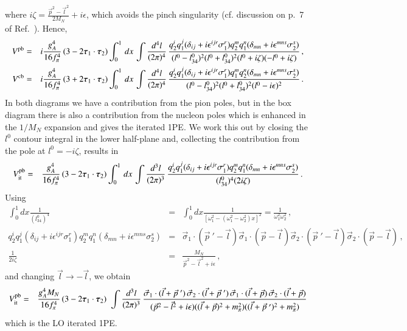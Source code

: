 \documentclass[sort&compress,preprint,3p]{elsarticle}
\begin{document}
where 
$i\zeta=\frac{\vec p^2-\vec l^2}{2M_N}+i\epsilon$, 
which avoids the pinch singularity (cf. discussion on p.~7 of Ref.~\cite{Wei91}). 
Hence,
%
\begin{eqnarray}
V^{\rm pb} &=& i \frac{g_A^4}{16 f_\pi^4} \,
(3-2 \mbox{\boldmath $\tau$}_1 \cdot \mbox{\boldmath $\tau$}_2)
\int_0^1\, dx\,\int \frac{d^4 l}{(2\pi)^4} \,
\frac{q^i_2 q^j_1 (\delta_{ij} + i \epsilon^{ijr} \sigma_1^r)
q_2^m q_1^n (\delta_{mn} + i \epsilon^{mns} \sigma_2^s)}
{(l^0-l^0_{34})^2(l^0+l^0_{34})^2(l^0+i\zeta)(-l^0+i\zeta)}
\,,
\\
V^{\rm cb} &=& i \frac{g_A^4}{16 f_\pi^4} \,
(3+2 \mbox{\boldmath $\tau$}_1 \cdot \mbox{\boldmath $\tau$}_2)
\int_0^1\, dx\,\int \frac{d^4 l}{(2\pi)^4} \,
\frac{q^i_2 q^j_1 (\delta_{ij} + i \epsilon^{ijr} \sigma_1^r)
q_1^m q_2^n (\delta_{mn} + i \epsilon^{mns} \sigma_2^s)}
{(l^0-l^0_{34})^2(l^0+l^0_{34})^2(l^0-i\epsilon)^2}
\,.
\end{eqnarray}
%
In both diagrams we have a contribution from the pion poles, but in the box
diagram there is also a contribution from the nucleon poles which is enhanced
in the $1/M_N$ expansion and gives the iterated 1PE. We work this out by
closing the $l^0$ contour integral in the lower half-plane and, collecting the
contribution from the pole at $l^0=-i\zeta$, results in
%
\begin{eqnarray}
V^{\rm pb}_{\rm it} &=& \frac{g_A^4}{16 f_\pi^4} \,
(3-2 \mbox{\boldmath $\tau$}_1 \cdot \mbox{\boldmath $\tau$}_2)
\int_0^1\, dx\,\int \frac{d^3 l}{(2\pi)^3} \,
\frac{q^i_2 q^j_1 (\delta_{ij} + i \epsilon^{ijr} \sigma_1^r)
q_2^m q_1^n (\delta_{mn} + i \epsilon^{mns} \sigma_2^s)}
{(l^0_{34})^4(2i\zeta)}
\,.
\end{eqnarray}
%
Using
\begin{eqnarray} 
\int_0^1 dx\frac{1}{ (l^0_{34})^4 } &=&
\int_0^1 dx\frac{1}{ [\omega_1^2-(\omega_1^2-\omega_2^2)x]^2 } =
\frac{1}{ \omega_1^2 \omega_2^2} 
\,,
\\
q^i_2 q^j_1 (\delta_{ij} + i \epsilon^{ijr} \sigma_1^r)
q_2^m q_1^n (\delta_{mn} + i \epsilon^{mns} \sigma_2^s) &=&
\vec \sigma_1 \cdot (\vec p~' - \vec l) \vec \sigma_1 \cdot (\vec p - \vec l) 
\vec \sigma_2 \cdot (\vec p~' - \vec l) \vec \sigma_2 \cdot (\vec p - \vec l) 
\,,
\\
\frac{1}{2i\zeta} &=& \frac{M_N}{{\vec p}^2-{\vec l}^2+i\epsilon}
\,,
\end{eqnarray}
and changing $\vec l \to -\vec l$, we obtain
%
\begin{eqnarray}
	V_{\rm it}^{\rm pb} &=& \frac{g_A^4M_N}{16 f_\pi^4} \,
(3-2 \mbox{\boldmath $\tau$}_1 \cdot \mbox{\boldmath $\tau$}_2) \,\,
\int \frac{d^3 l}{(2\pi)^3} \,
\frac{
\vec \sigma_1 \cdot (\vec l+\vec p~') \, 
\vec \sigma_2 \cdot (\vec l+\vec p~') \, 
\vec \sigma_1 \cdot (\vec l+\vec p  ) \, 
\vec \sigma_2 \cdot (\vec l+\vec p  )}
{(\vec p^2-\vec{l}^2+i\epsilon)((\vec{l}+\vec{p})^2+m_\pi^2)((\vec{l}+{\vec p}~')^2+m_\pi^2)}
\end{eqnarray}
%
which is the LO iterated 1PE. 
\end{document}
